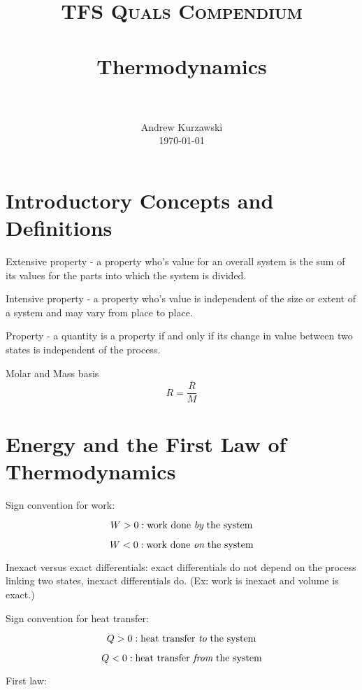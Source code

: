 \documentclass[paper=letter, fontsize=11pt]{scrartcl}
\title{
        \usefont{OT1}{bch}{b}{n}
        \normalfont \normalsize \textsc{TFS Quals Compendium} \\ [25pt]
        \horrule{0.5pt} \\[0.4cm]
        \huge Thermodynamics \\
        \horrule{2pt} \\[0.5cm]
}
\author{
        \normalfont                                 \normalsize
        Andrew Kurzawski\\[-3pt]      \normalsize
        \today
}
\date{}
\numberwithin{equation}{section}        %
\numberwithin{figure}{section}          %
\numberwithin{table}{section}               %
\begin{document}
\maketitle

\section{Introductory Concepts and Definitions}
    
Extensive property - a property who's value for an overall system is the sum of its values for the parts into which the system is divided.

Intensive property - a property who's value is independent of the size or extent of a system and may vary from place to place.

Property - a quantity is a property if and only if its change in value between two states is independent of the process.

Molar and Mass basis
\begin{equation}
    R = \frac{\bar R}{M}
\end{equation}


\section{Energy and the First Law of Thermodynamics}

Sign convention for work:

\begin{equation}
W > 0:\text{work done {\it by} the system}
\end{equation}

\begin{equation}
W < 0:\text{work done {\it on} the system}
\end{equation}

Inexact versus exact differentials: exact differentials do not depend on the process linking two states, inexact differentials do. (Ex: work is inexact and volume is exact.)

Sign convention for heat transfer:

\begin{equation}
Q > 0:\text{heat transfer {\it to} the system}
\end{equation}

\begin{equation}
Q < 0:\text{heat transfer {\it from} the system}
\end{equation}

First law:
\end{document}
